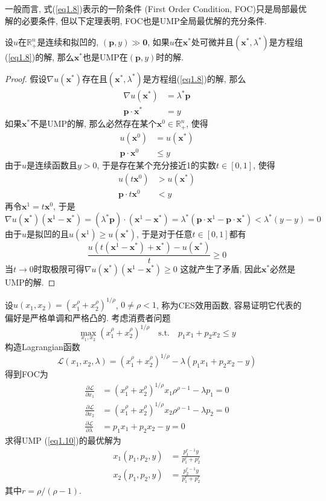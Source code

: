 \documentclass[cn, 12pt, math=mtpro2, bibstyle=apa, blue, twocol]{elegantbook}
\newcommand{\R}{\mathbb{R}}
\newcommand{\p}{\mathbf{p}}
\newcommand{\x}{\mathbf{x}}
\begin{document}
一般而言, 式(\ref{eq1.8})表示的一阶条件 (First Order Condition, FOC)只是局部最优解的必要条件, 但以下定理表明, FOC也是UMP全局最优解的充分条件.

\begin{theorem}\label{thm:thm1.7}
  设$u$在$\R_+^n$是连续和拟凹的, $(\p,y)\gg\mathbf{0}$, 如果$u$在$\x^\ast$处可微并且$(\x^\ast,\lambda^\ast)$是方程组(\ref{eq1.8})的解, 那么$\x^\ast$也是UMP在$(\p,y)$时的解.
\end{theorem}
\begin{proof}
  假设$\nabla u(\x^\ast)$存在且$(\x^\ast,\lambda^\ast)$是方程组(\ref{eq1.8})的解, 那么
  \begin{align*}
  \nabla u(\x^\ast)&=\lambda^\ast\p \\
  \p\cdot\x^\ast&=y
  \end{align*}
  如果$\x^\ast$不是UMP的解, 那么必然存在某个$\x^0\in \R^n_+$, 使得
  \begin{align*}
  u(\x^0)&=u(\x^\ast) \\
  \p\cdot\x^0&\leq y
  \end{align*}
  由于$u$是连续函数且$y>0$, 于是存在某个充分接近1的实数$t\in [0,1]$, 使得
  \begin{align*}
  u(t\x^0)&>u(\x^\ast) \\
  \p\cdot t\x^0&<y
  \end{align*}
  再令$\x^1=t\x^0$, 于是
  $$\nabla u(\x^\ast)(\x^1-\x^\ast)=(\lambda^\ast\p)\cdot(\x^1-\x^\ast)=\lambda^\ast(\p\cdot\x^1-\p\cdot\x^\ast)<\lambda^\ast(y-y)=0$$
  由于$u$是拟凹的且$u(\x^1)\geq u(\x^\ast)$, 于是对于任意$t\in[0,1]$都有
  $$\frac{u(t(\x^1-\x^\ast)+\x^\ast)-u(\x^\ast)}{t}\ge0$$
  当$t\to0$时取极限可得$\nabla u(\x^\ast)(\x^1-\x^\ast)\ge 0$
  这就产生了矛盾, 因此$\x^\ast$必然是UMP的解.
\end{proof}
\begin{example}
设$u(x_1,x_2)=(x_1^\rho+x_2^\rho)^{1/\rho}$, $0\ne \rho<1$, 称为CES效用函数, 容易证明它代表的偏好是严格单调和严格凸的. 考虑消费者问题
\begin{equation}\label{eq1.10}
  \max_{x_1,x_2}(x_1^\rho+x_2^\rho)^{1/\rho}\quad \text{s.t.}\quad p_1x_1+p_2x_2\leq y
\end{equation}
构造Lagrangian函数
$$\mathcal{L}(x_1,x_2,\lambda)=(x_1^\rho+x_2^\rho)^{1/\rho}-\lambda(p_1x_1+p_2x_2-y)$$
得到FOC为
\begin{align*}
\frac{\partial \mathcal{L}}{\partial x_1}&=(x_1^\rho+x_2^\rho)^{1/\rho}x_1\rho^{\rho-1}-\lambda p_1=0 \\
\frac{\partial \mathcal{L}}{\partial x_2}&=(x_1^\rho+x_2^\rho)^{1/\rho}x_2\rho^{\rho-1}-\lambda p_2=0 \\
\frac{\partial \mathcal{L}}{\partial \lambda}&=p_1x_1+p_2x_2-y=0
\end{align*}
求得UMP (\ref{eq1.10})的最优解为
\begin{align*}
x_1(p_1,p_2,y)&=\frac{p_1^{r-1}y}{p_1^r+p_2^r} \\
x_2(p_1,p_2,y)&=\frac{p_2^{r-1}y}{p_1^r+p_2^r}
\end{align*}
其中$r=\rho/(\rho-1)$.
\end{example}
\end{document}
